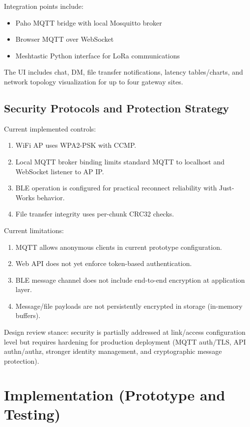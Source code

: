 \documentclass[conference]{IEEEtran}
\begin{document}
Integration points include:
\begin{itemize}
\item Paho MQTT bridge with local Mosquitto broker
\item Browser MQTT over WebSocket
\item Meshtastic Python interface for LoRa communications
\end{itemize}

The UI includes chat, DM, file transfer notifications, latency tables/charts, and network topology visualization for up to four gateway sites.

\subsection{Security Protocols and Protection Strategy}
Current implemented controls:
\begin{enumerate}
\item WiFi AP uses WPA2-PSK with CCMP.
\item Local MQTT broker binding limits standard MQTT to localhost and WebSocket listener to AP IP.
\item BLE operation is configured for practical reconnect reliability with Just-Works behavior.
\item File transfer integrity uses per-chunk CRC32 checks.
\end{enumerate}

Current limitations:
\begin{enumerate}
\item MQTT allows anonymous clients in current prototype configuration.
\item Web API does not yet enforce token-based authentication.
\item BLE message channel does not include end-to-end encryption at application layer.
\item Message/file payloads are not persistently encrypted in storage (in-memory buffers).
\end{enumerate}

Design review stance: security is partially addressed at link/access configuration level but requires hardening for production deployment (MQTT auth/TLS, API authn/authz, stronger identity management, and cryptographic message protection).

\section{Implementation (Prototype and Testing)}
\end{document}
